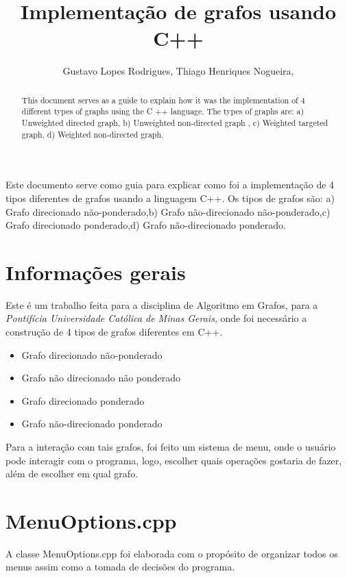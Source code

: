 \documentclass[12pt]{article}
\title{Implementação de grafos usando C++}
\author{Gustavo Lopes Rodrigues\inst{1}, Thiago Henriques Nogueira\inst{2},}
\begin{document}
 

\maketitle

\begin{abstract} 
  This document serves as a guide to explain how it
  was the implementation
  of 4 different types of graphs using the C ++ language. The types of
  graphs are: a) Unweighted directed graph, b) Unweighted non-directed graph
  , c) Weighted targeted graph, d) Weighted non-directed graph.
\end{abstract}

\begin{resumo} 
  Este documento serve como guia para explicar como 
  foi a implementação
  de 4 tipos diferentes de grafos usando a linguagem C++. Os tipos de 
  grafos são: a) Grafo direcionado não-ponderado,b) Grafo não-direcionado 
  não-ponderado,c) Grafo direcionado ponderado,d) Grafo não-direcionado 
  ponderado.
\end{resumo}


\section{Informações gerais}

  Este é um trabalho feita para a disciplina de Algoritmo em Grafos, para a \emph{Pontifícia Universidade Católica de Minas Gerais},
  onde foi necessário a construção de 4 tipos de grafos diferentes em C++.

  \begin{itemize}
    \item Grafo direcionado não-ponderado
    \item Grafo não direcionado não ponderado 
    \item Grafo direcionado ponderado
    \item Grafo não-direcionado ponderado
  \end{itemize}

  Para a interação com tais grafos, foi feito um sistema de menu, onde o usuário pode interagir com o programa,
  logo, escolher quais operações gostaria de fazer, além de escolher em qual grafo.

  \section{MenuOptions.cpp}

  A classe MenuOptions.cpp foi elaborada com o propósito de organizar todos os menus assim como a tomada de decisões do programa.
\end{document}

